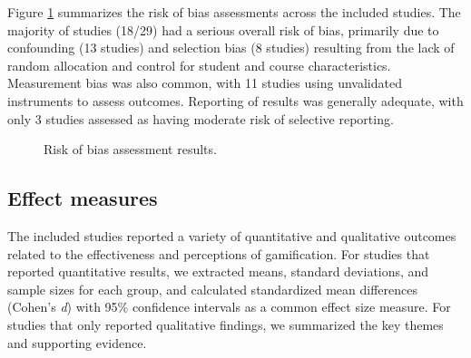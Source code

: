 \documentclass[
	hf,
	]{ceurart}
\begin{document}
		Figure \ref{fig:riskofbias} summarizes the risk of bias assessments across the included studies. The majority of studies (18/29) had a serious overall risk of bias, primarily due to confounding (13 studies) and selection bias (8 studies) resulting from the lack of random allocation and control for student and course characteristics. Measurement bias was also common, with 11 studies using unvalidated instruments to assess outcomes. Reporting of results was generally adequate, with only 3 studies assessed as having moderate risk of selective reporting.
		
		\begin{figure}[h]
			\centering
			\caption{Risk of bias assessment results.}
			\label{fig:riskofbias}
		\end{figure}
		
		\subsection{Effect measures}
		
		The included studies reported a variety of quantitative and qualitative outcomes related to the effectiveness and perceptions of gamification. For studies that reported quantitative results, we extracted means, standard deviations, and sample sizes for each group, and calculated standardized mean differences (Cohen's \textit{d}) with 95\% confidence intervals as a common effect size measure. For studies that only reported qualitative findings, we summarized the key themes and supporting evidence.
		
\end{document}
